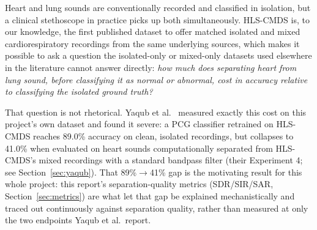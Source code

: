\documentclass[11pt]{article}
\begin{document}
Heart and lung sounds are conventionally recorded and classified in
isolation, but a clinical stethoscope in practice picks up both
simultaneously. HLS-CMDS \cite{hlscmds} is, to our knowledge, the first
published dataset to offer matched isolated and mixed cardiorespiratory
recordings from the same underlying sources, which makes it possible to ask
a question the isolated-only or mixed-only datasets used elsewhere in the
literature cannot answer directly: \emph{how much does separating heart from
lung sound, before classifying it as normal or abnormal, cost in accuracy
relative to classifying the isolated ground truth?}

That question is not rhetorical. Yaqub et al.\ \cite{spectrotemporal}
measured exactly this cost on this project's own dataset and found it
severe: a PCG
classifier retrained on HLS-CMDS reaches 89.0\% accuracy on clean, isolated
recordings, but collapses to 41.0\% when evaluated on heart sounds
computationally separated from HLS-CMDS's mixed recordings with a standard
bandpass filter (their Experiment 4; see Section~\ref{sec:yaqub}). That
89\%$\to$41\% gap is the motivating result for this whole project: this
report's separation-quality metrics (SDR/SIR/SAR, Section~\ref{sec:metrics})
are what let that gap be explained mechanistically and traced out
continuously against separation quality, rather than measured at only the
two endpoints Yaqub et al.\ report.
\end{document}
